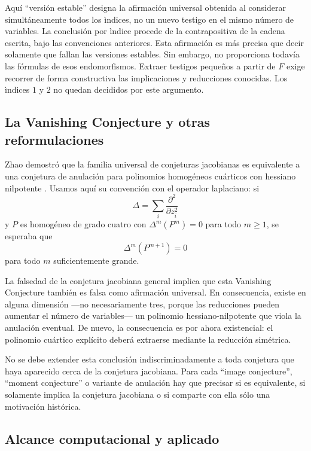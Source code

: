 \documentclass[11pt]{article}
\theoremstyle{definition}
\theoremstyle{remark}
\begin{document}
Aqu\'i ``versi\'on estable'' designa la afirmaci\'on universal obtenida al
considerar simult\'aneamente todos los \`indices, no un nuevo testigo en el
mismo n\'umero de variables. La conclusi\'on por \`indice procede de la
contrapositiva de la cadena escrita, bajo las convenciones anteriores. Esta
afirmaci\'on es m\'as precisa que decir solamente que fallan las versiones
estables. Sin embargo, no proporciona todav\'ia las f\'ormulas de esos
endomorfismos. Extraer testigos peque\~nos a partir de $F$ exige recorrer de
forma constructiva las implicaciones y reducciones conocidas. Los \`indices
$1$ y $2$ no quedan decididos por este argumento.

\subsection{La Vanishing Conjecture y otras reformulaciones}

Zhao demostr\'o que la familia universal de conjeturas jacobianas es
equivalente a una conjetura de anulaci\'on para polinomios homog\'eneos
cu\'articos con hessiano nilpotente \cite{Zhao2004}. Usamos aqu\'i su
convenci\'on con el operador laplaciano: si
\[
\Delta=\sum_i\frac{\partial^2}{\partial z_i^2}
\]
y $P$ es homog\'eneo de grado cuatro con
$\Delta^m(P^m)=0$ para todo $m\geq1$, se esperaba que
\[
\Delta^m(P^{m+1})=0
\]
para todo $m$ suficientemente grande.

La falsedad de la conjetura jacobiana general implica que esta Vanishing
Conjecture tambi\'en es falsa como afirmaci\'on universal. En consecuencia,
existe en alguna dimensi\'on ---no necesariamente tres, porque las reducciones
pueden aumentar el n\'umero de variables--- un polinomio hessiano-nilpotente
que viola la anulaci\'on eventual. De nuevo, la consecuencia es por ahora
existencial: el
polinomio cu\'artico expl\'icito deber\'a extraerse mediante la reducci\'on
sim\'etrica.

No se debe extender esta conclusi\'on indiscriminadamente a toda conjetura que
haya aparecido cerca de la conjetura jacobiana. Para cada ``image
conjecture'', ``moment conjecture'' o variante de anulaci\'on hay que precisar
si es equivalente, si solamente implica la conjetura jacobiana o si comparte
con ella s\'olo una motivaci\'on hist\'orica.

\subsection{Alcance computacional y aplicado}
\end{document}
